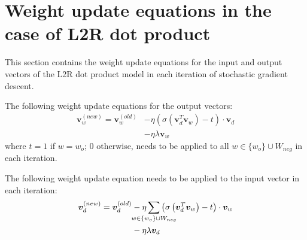 \documentclass[11pt,a4paper]{article}
\begin{document}
\section{Weight update equations in the case of L2R dot product}
This section contains the weight update equations for the input and output vectors of the L2R dot product model in each iteration of stochastic gradient descent.

The following weight update equations for the output vectors:
\begin{align}
\mathbold{v}_w^{(new)} = \mathbold{v}_w^{(old)} &- \eta \left( \sigma \left( \mathbold{v}_d^T \mathbold{v}_w \right) - t \right) \cdot \mathbold{v}_d \nonumber \\
&- \eta \lambda \mathbold{v}_w
\end{align}
where $t = 1$ if $w = w_o$; $0$ otherwise, needs to be applied to all $w \in \{w_o\} \cup W_{neg}$ in each iteration.

The following weight update equation needs to be applied to the input vector in each iteration:
\begin{align}
\mathbold{v}_d^{(new)} = \mathbold{v}_d^{(old)} &- \eta \sum_{\mathclap{w \in \{w_o\} \cup W_{neg}}} \left( \sigma \left( \mathbold{v}_d^T \mathbold{v}_w \right) - t \right) \cdot \mathbold{v}_w \nonumber \\
&- \eta \lambda \mathbold{v}_d
\end{align}
\end{document}
